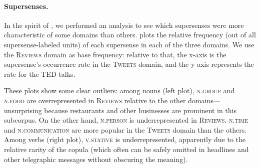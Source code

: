\documentclass[11pt,letterpaper]{article}
\newcommand{\sst}[1]{\textsc{#1}} %
\newcommand{\dataset}[1]{\mbox{\textsc{#1}}}	%
\begin{document}
\paragraph{Supersenses.} In the spirit of \citet{schneider-12}, we performed an analysis to see 
which supersenses were more characteristic of some domains than others. 
 plots the relative frequency (out of all supersense-labeled units) 
of each supersense in each of the three domains. We use the \dataset{Reviews} domain as base frequency: 
relative to that, 
the x-axis is the supersense's occurrence rate in the \dataset{Tweets} domain, 
and the y-axis represents the rate for the \dataset{TED} talks.

These plots show some clear outliers: among nouns (left plot), 
\sst{n.group} and \sst{n.food} are overrepresented in \dataset{Reviews} 
relative to the other domains---unsurprising because restaurants and other businesses are prominent in this subcorpus.
On the other hand, \sst{n.person} is underrepresented in \dataset{Reviews}. 
\sst{n.time} and \sst{n.communication} are more popular in the \dataset{Tweets} domain than the others.
Among verbs (right plot), \sst{v.stative} is underrepresented, apparently due to the relative rarity of 
the copula (which often can be safely omitted in headlines and other telegraphic messages 
without obscuring the meaning).
\end{document}
